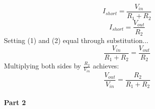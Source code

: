 \documentclass{article}
\begin{document}
\begin{enumerate}
    \begin{equation}
        I_{short} = \frac{V_{in}}{R_1 + R_2} 
    \end{equation}
    \begin{equation}
        I_{short} = \frac{V_{out}}{R_2} 
    \end{equation}
    Setting (1) and (2) equal through substitution...
    \begin{equation}
        \frac{V_{in}}{R_1 + R_2} = \frac{V_{out}}{R_2}
    \end{equation}
    Multiplying both sides by $\frac{R_2}{V_{in}}$ achieves:
    \begin{equation}
        \frac{V_{out}}{V_{in}} = \frac{R_2}{R_1 + R_2}
    \end{equation}

\end{enumerate}


\paragraph{Part 2}
\end{document}
